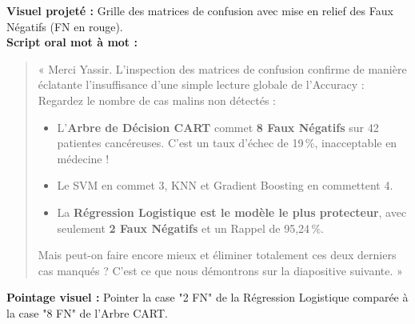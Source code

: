 \documentclass[a4paper,11pt]{article}
\begin{document}
\begin{tcolorbox}[speechbox, title={Slide 8 : Analyse Fine du Rappel \& Matrices de Confusion (06:45 -- 07:30)}]
	\textbf{Visuel projeté :} Grille des matrices de confusion avec mise en relief des Faux Négatifs (FN en rouge).\\
	\textbf{Script oral mot à mot :}
	\begin{quote}
		« Merci Yassir. L'inspection des matrices de confusion confirme de manière éclatante l'insuffisance d'une simple lecture globale de l'Accuracy :\\
		Regardez le nombre de cas malins non détectés :
		\begin{itemize}[leftmargin=0.5cm, itemsep=1pt]
			\item L'\textbf{Arbre de Décision CART} commet \textbf{8 Faux Négatifs} sur 42 patientes cancéreuses. C'est un taux d'échec de 19\,\%, inacceptable en médecine !
			\item Le SVM en commet 3, KNN et Gradient Boosting en commettent 4.
			\item La \textbf{Régression Logistique est le modèle le plus protecteur}, avec seulement \textbf{2 Faux Négatifs} et un Rappel de 95,24\,\%.
		\end{itemize}
		Mais peut-on faire encore mieux et éliminer totalement ces deux derniers cas manqués ? C'est ce que nous démontrons sur la diapositive suivante. »
	\end{quote}
	\textbf{Pointage visuel :} Pointer la case "2 FN" de la Régression Logistique comparée à la case "8 FN" de l'Arbre CART.
\end{tcolorbox}
\end{document}
